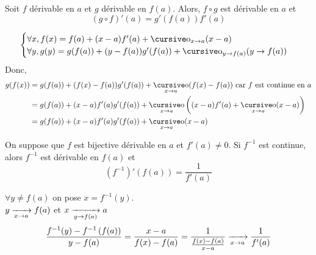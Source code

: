 \begin{prop}
	Soit $f$ dérivable en $a$ et $g$ dérivable en $f(a)$. Alors, $f \circ g$ est dérivable en $a$ et \[
		\left(g\circ f\right)'(a) = g'(f(a)) f'(a)
	\] 
\end{prop}

\begin{prv}
	\[
		\begin{cases}
			\forall x, f(x) = f(a) + (x-a)f'(a) +\po_{x\to a}(x-a)\\
			\forall y, g(y) = g(f(a)) + (y-f(a))g'(f(a)) + \po_{y\to f(a)}(y \to f(a))\\
		\end{cases}
	\] Donc, 
	\begin{align*}
		g(f(x)) &= g(f(a)) + (f(x) - f(a)) g'(f(a)) + \po_{x \to a} (f(x) - f(a)) \text{ car $f$ est continue en $a$} \\
		&= g(f(a)) + (x-a)f'(a)g'(f(a)) + \po_{x\to a}\left( (x-a)f'(a) + \po_{x\to a}(x-a) \right)  \\
		&= g(f(a)) + (x-a) f'(a)g'(f(a)) + \po_{x\to a}(x-a)
	\end{align*}
\end{prv}


\begin{prop}
	On suppose que $f$ est bijective dérivable en $a$ et $f'(a) \neq 0$. Si $f^{-1}$ est continue, alors $f^{-1}$ est dérivable en $f(a)$ et \[
		\left( f^{-1} \right) ' \left( f(a) \right)  = \frac{1}{f'(a)}
	\] 
\end{prop}

\begin{prv}
	$\forall y \neq f(a)$ on pose $x = f^{-1}(y)$.\\
	$y \xrightarrow[x \to a]{} f(a)$ et $x \xrightarrow[y \to f(a)]{} a$ \\
	\begin{align*}
		\frac{f^{-1}(y) - f^{-1}\left( f(a) \right) }{y - f(a)} = \frac{x-a}{f(x) - f(a)} = \frac{1}{\frac{f(x)-f(a)}{x-a}} \xrightarrow[x \to a]{} \frac{1}{f'(a)}
	\end{align*}
\end{prv}

